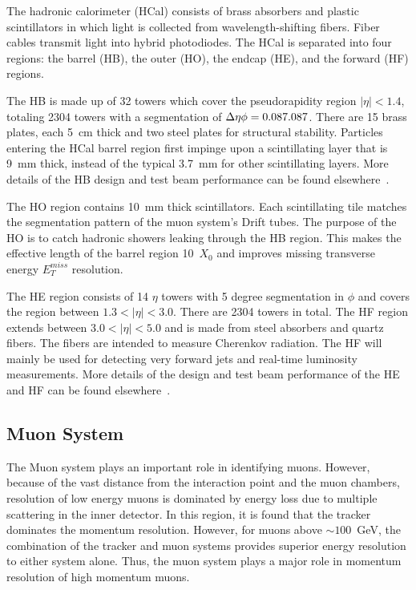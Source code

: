 The hadronic calorimeter (HCal) consists of brass absorbers and 
plastic scintillators in which light is collected from 
wavelength-shifting fibers. Fiber cables transmit light into 
hybrid photodiodes.  The HCal is separated into four regions:
the barrel (HB), the outer (HO), the endcap (HE), and the forward 
(HF) regions.

The HB is made up of 32 towers which cover the pseudorapidity 
region $|\eta|<1.4$, totaling 2304 towers with a segmentation 
of $\Delta\eta\time\Delta\phi=0.087\time0.087$.  There are 15 
brass plates, each 5~cm thick and two steel plates for structural 
stability. Particles entering the HCal barrel region first impinge 
upon a scintillating layer that is 9~mm thick, instead of the 
typical 3.7~mm for other scintillating layers. More details of the 
HB design and test beam performance can be found 
elsewhere~\cite{Bayatian:2006zz,Ball:2007zza}.

The HO region contains 10~mm thick scintillators.  Each 
scintillating tile matches the segmentation pattern of the muon 
system's Drift tubes.  The purpose of the HO is to catch hadronic 
showers leaking through the HB region. This makes the effective 
length of the barrel region 10~$X_0$ and improves missing 
transverse energy $E_T^{miss}$ resolution.

The HE region consists of 14 $\eta$ towers with 5 degree
segmentation in $\phi$ and covers the region between 
$1.3<|\eta|<3.0$.  There are 2304 towers in total.  
The HF region extends between $3.0<|\eta|<5.0$ and is made from steel absorbers
and quartz fibers.  The fibers are intended to measure Cherenkov radiation.  
The HF will mainly be used for detecting very forward jets and real-time
luminosity measurements.  
More details of
the design and test beam performance of the HE and HF can be found 
elsewhere~\cite{Bayatian:2006zz,Ball:2007zza}.


\subsection{Muon System}
\label{sec:Muon System}

The Muon system plays an important role in identifying muons.  However, 
because of the vast distance from the interaction point and the muon 
chambers, resolution of low energy muons is dominated by energy loss 
due to multiple scattering in the inner detector.  In this region, it 
is found that the tracker dominates the momentum resolution.  However, 
for muons above $\sim100$~GeV, the combination of the tracker and muon systems
provides superior energy resolution to either system alone. Thus,
the muon system plays a major role in momentum resolution of high
momentum muons.

